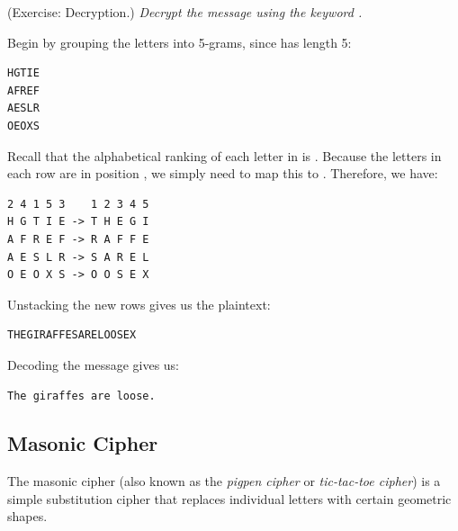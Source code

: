 \documentclass[letterpaper]{article}
\begin{document}
\begin{mdframed}[nobreak=true]
    (Exercise: Decryption.) \emph{Decrypt the message  using the keyword .}

    \begin{mdframed}
        Begin by grouping the letters into 5-grams, since  has length 5:
        \begin{mdframed}
            \begin{verbatim}
HGTIE
AFREF
AESLR
OEOXS\end{verbatim}
        \end{mdframed}
        Recall that the alphabetical ranking of each letter in  is . Because the letters in each row are in position , we simply need to map this to . Therefore, we have:
        \begin{mdframed}
            \begin{verbatim}
2 4 1 5 3    1 2 3 4 5
H G T I E -> T H E G I
A F R E F -> R A F F E
A E S L R -> S A R E L
O E O X S -> O O S E X\end{verbatim}
        \end{mdframed}
        Unstacking the new rows gives us the plaintext:
        \begin{mdframed}
            \begin{verbatim}
THEGIRAFFESARELOOSEX\end{verbatim}
        \end{mdframed}
        Decoding the message gives us: 
        \begin{mdframed}
            \begin{verbatim}
The giraffes are loose.\end{verbatim}
        \end{mdframed}
    \end{mdframed}

\end{mdframed}


\subsection{Masonic Cipher}
The masonic cipher (also known as the \emph{pigpen cipher} or \emph{tic-tac-toe cipher}) is a simple substitution cipher that replaces individual letters with certain geometric shapes.

\bigskip 
\end{document}
